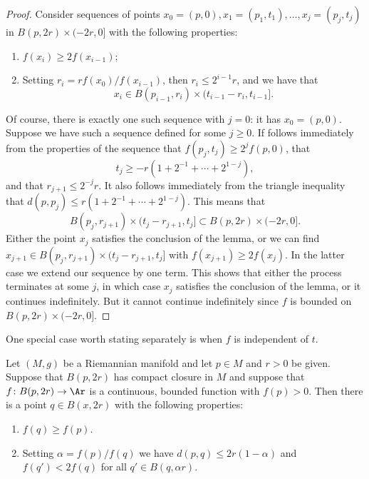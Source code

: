 \begin{proof}
Consider sequences of points
$x_0=(p,0),x_1=(p_1,t_1),\ldots,x_j=(p_j,t_j)$ in $B(p,2r)\times
(-2r,0]$ with the following properties:
\begin{enumerate}
\item[(1)] $f(x_i)\ge 2f(x_{i-1})$;
\item[(2)] Setting $r_i=rf(x_0)/f(x_{i-1})$, then $r_i\le 2^{i-1}r$, and
 we have that $$x_i\in
B(p_{i-1},r_i)\times (t_{i-1}-r_i,t_{i-1}].$$
\end{enumerate}

Of course, there is exactly one such sequence with  $j=0$: it has
$x_0=(p,0)$. Suppose we have such a sequence defined for some $j\ge
0$. If follows immediately from the properties of the sequence that
$f(p_j,t_j)\ge 2^jf(p,0)$, that
$$t_j\ge -r(1+2^{-1}+\cdots+2^{1-j}),$$
and that $r_{j+1}\le 2^{-j}r$. It also follows immediately from the
triangle inequality that $d(p,p_j)\le r(1+2^{-1}+\cdots +2^{1-j})$.
 This means that
 $$B(p_j,r_{j+1})\times(t_j-r_{j+1},t_j]\subset B(p,2r)\times (-2r,0].$$
  Either the point
$x_j$ satisfies the conclusion of the lemma, or we can find
$x_{j+1}\in B(p_j,r_{j+1})\times (t_j-r_{j+1},t_j]$ with
$f(x_{j+1})\ge 2f(x_j)$. In the latter case we extend our sequence
by one term. This shows that either the process terminates at some
$j$, in which case $x_j$ satisfies the conclusion of the lemma, or
it continues indefinitely. But it cannot continue indefinitely since
$f$ is bounded on $B(p,2r)\times (-2r,0]$.
\end{proof}

One special case worth stating separately is when $f$ is independent
of $t$.


\begin{corollary}\label{cor:point-picking-time-independent}
\label{pp}
Let $(M,g)$ be a Riemannian manifold  and let $p\in M$ and $r>0$ be given.
Suppose that $B(p,2r)$ has compact closure in $M$ and suppose that $f\colon
B(p,2r)\to \Ar$ is a continuous, bounded function with $f(p)>0$. Then there is
a point $q\in B(x,2r)$ with the following properties:
\begin{enumerate}
\item[(1)] $f(q)\ge f(p)$.
\item[(2)] Setting $\alpha=f(p)/f(q)$ we have $d(p,q)\le 2r(1-\alpha)$
and $f(q')<2f(q)$ for all $q'\in B(q,\alpha r)$.
\end{enumerate}
\end{corollary}

